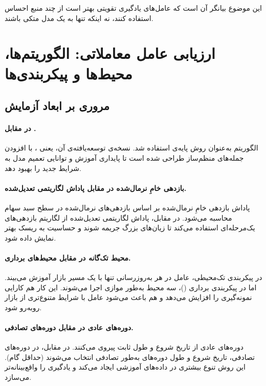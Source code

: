 \documentclass[12pt, a4paper]{report}
\begin{document}
این موضوع بیانگر آن است که عامل‌های یادگیری تقویتی بهتر است از چند منبع احساس استفاده کنند،  
نه اینکه تنها به یک مدل متکی باشند.  


\section{ارزیابی عامل معاملاتی: الگوریتم‌ها، محیط‌ها و پیکربندی‌ها}

\subsection{مروری بر ابعاد آزمایش}

\paragraph{ در مقابل .}
الگوریتم  به‌عنوان روش پایه‌ی  استفاده شد.  
نسخه‌ی توسعه‌یافته‌ی آن، یعنی ، با افزودن جمله‌های منظم‌ساز طراحی شده است  
تا پایداری آموزش و توانایی تعمیم مدل به شرایط جدید را بهبود دهد.  

\paragraph{بازدهی خامِ نرمال‌شده در مقابل پاداش لگاریتمی تعدیل‌شده.}
پاداش بازدهی خامِ نرمال‌شده بر اساس بازدهی‌های نرمال‌شده در سطح سبد سهام محاسبه می‌شود.  
در مقابل، پاداش لگاریتمی تعدیل‌شده از لگاریتم بازدهی‌های یک‌مرحله‌ای استفاده می‌کند  
تا زیان‌های بزرگ جریمه شوند و حساسیت به ریسک بهتر نمایش داده شود.  

\paragraph{محیط تک‌گانه در مقابل محیط‌های برداری.}
در پیکربندی تک‌محیطی، عامل در هر به‌روزرسانی تنها با یک مسیر بازار آموزش می‌بیند.  
اما در پیکربندی برداری ()، سه محیط به‌طور موازی اجرا می‌شوند.  
این کار هم کارایی نمونه‌گیری را افزایش می‌دهد و هم باعث می‌شود عامل با شرایط متنوع‌تری از بازار روبه‌رو شود.  

\paragraph{دوره‌‌های عادی در مقابل دوره‌های تصادفی.}
دوره‌‌های عادی از تاریخ شروع و طول ثابت پیروی می‌کنند.  
در مقابل، در دوره‌‌های تصادفی، تاریخ شروع و طول دوره‌‌های به‌طور تصادفی انتخاب می‌شوند  
(حداقل  گام).  
این روش تنوع بیشتری در داده‌های آموزشی ایجاد می‌کند و یادگیری را واقع‌بینانه‌تر می‌سازد.  
\end{document}
